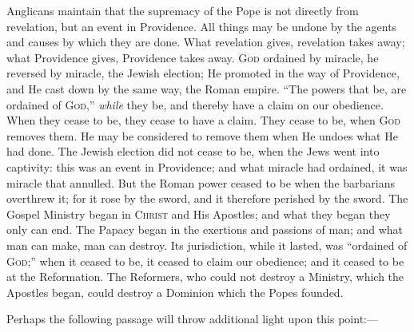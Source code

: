 Anglicans maintain that the supremacy of the Pope is not directly
from revelation, but an event in Providence. All things may be undone
by the agents and causes by which they are done. What revelation
gives, revelation takes away; what Providence gives, Providence takes
away. G\textsc{od} ordained by miracle, he reversed by
miracle, the Jewish election; He promoted in the way of Providence,
and He cast down by the same way, the Roman empire. ``The powers
that be, are ordained of G\textsc{od},'' \emph{while}
they be, and thereby have a claim on our obedience. When they cease to
be, they cease to have a claim. They cease to be, when G\textsc{od}
removes them. He may be considered to remove them when He undoes what
He had done. The Jewish election did not cease to be, when the
Jews went into captivity: this was an event in Providence; and what
miracle had ordained, it was miracle that annulled. But the Roman
power ceased to be when the barbarians overthrew it; for it rose by
the sword, and it therefore perished by the sword. The Gospel Ministry
began in C\textsc{hrist} and His Apostles; and what they
began they only can end. The Papacy began in the exertions and
passions of man; and what man can make, man can destroy. Its
jurisdiction, while it lasted, was ``ordained of G\textsc{od};''
when it ceased to be, it ceased to claim our obedience; and it ceased
to be at the Reformation. The Reformers, who could not destroy a
Ministry, which the Apostles began, could destroy a Dominion which the
Popes founded.

Perhaps the following passage will throw additional light upon this
point:—

